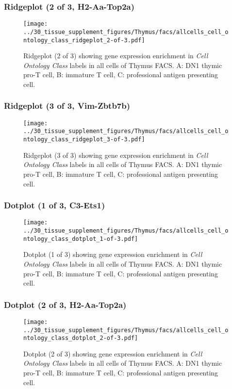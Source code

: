 \clearpage

\subsubsection{Ridgeplot (2 of 3, H2-Aa-Top2a)}
\begin{figure}[h]
\centering
\texttt{[image: ../30\_tissue\_supplement\_figures/Thymus/facs/allcells\_cell\_ontology\_class\_ridgeplot\_2-of-3.pdf]}

\caption{ Ridgeplot (2 of 3)  showing gene expression enrichment in \emph{Cell Ontology Class} labels in all cells of Thymus FACS. A: DN1 thymic pro-T cell, B: immature T cell, C: professional antigen presenting cell.}
\end{figure}


\clearpage

\subsubsection{Ridgeplot (3 of 3, Vim-Zbtb7b)}
\begin{figure}[h]
\centering
\texttt{[image: ../30\_tissue\_supplement\_figures/Thymus/facs/allcells\_cell\_ontology\_class\_ridgeplot\_3-of-3.pdf]}

\caption{ Ridgeplot (3 of 3)  showing gene expression enrichment in \emph{Cell Ontology Class} labels in all cells of Thymus FACS. A: DN1 thymic pro-T cell, B: immature T cell, C: professional antigen presenting cell.}
\end{figure}


\clearpage

\subsubsection{Dotplot (1 of 3, C3-Ets1)}
\begin{figure}[h]
\centering
\texttt{[image: ../30\_tissue\_supplement\_figures/Thymus/facs/allcells\_cell\_ontology\_class\_dotplot\_1-of-3.pdf]}

\caption{ Dotplot (1 of 3)  showing gene expression enrichment in \emph{Cell Ontology Class} labels in all cells of Thymus FACS. A: DN1 thymic pro-T cell, B: immature T cell, C: professional antigen presenting cell.}
\end{figure}


\clearpage

\subsubsection{Dotplot (2 of 3, H2-Aa-Top2a)}
\begin{figure}[h]
\centering
\texttt{[image: ../30\_tissue\_supplement\_figures/Thymus/facs/allcells\_cell\_ontology\_class\_dotplot\_2-of-3.pdf]}

\caption{ Dotplot (2 of 3)  showing gene expression enrichment in \emph{Cell Ontology Class} labels in all cells of Thymus FACS. A: DN1 thymic pro-T cell, B: immature T cell, C: professional antigen presenting cell.}
\end{figure}


